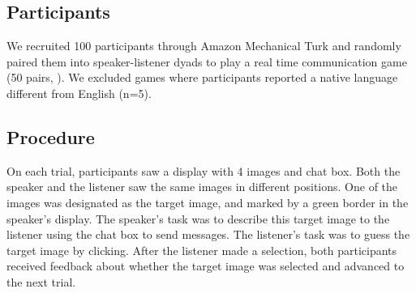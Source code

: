 \documentclass[12pt,letterpaper]{article}
\begin{document}
\subsection{Participants} 

We recruited 100 participants through Amazon Mechanical Turk and randomly paired them into speaker-listener dyads to play a real time communication game (50 pairs, \citealt{Hawkins2015}). We excluded games where participants reported a native language different from English (n=5).

\subsection{Procedure} 

On each trial, participants saw a display with 4 images and chat box. Both the speaker and the listener saw the same images in different positions. One of the images was designated as the target image, and marked by a green border in the speaker's display. The speaker's task was to describe this target image to the listener using the chat box to send messages. The listener's task was to guess the target image by clicking. After the listener made a selection, both participants received feedback about whether the target image was selected and advanced to the next trial. 
\end{document}

